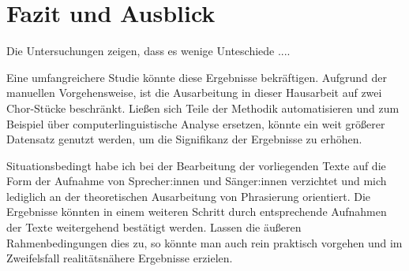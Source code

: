 \chapter{Fazit und Ausblick}
\label{chap:Fazit und Ausblick}



Die Untersuchungen zeigen, dass es wenige Unteschiede ....

Eine umfangreichere Studie könnte diese Ergebnisse bekräftigen. Aufgrund der manuellen Vorgehensweise, ist die Ausarbeitung in dieser Hausarbeit auf zwei Chor-Stücke beschränkt. Ließen sich Teile der Methodik automatisieren und zum Beispiel über computerlinguistische Analyse ersetzen, könnte ein weit größerer Datensatz genutzt werden, um die Signifikanz der Ergebnisse zu erhöhen.

Situationsbedingt habe ich bei der Bearbeitung der vorliegenden Texte auf die Form der Aufnahme von Sprecher:innen und Sänger:innen verzichtet und mich lediglich an der theoretischen Ausarbeitung von Phrasierung orientiert. Die Ergebnisse könnten in einem weiteren Schritt durch entsprechende Aufnahmen der Texte weitergehend bestätigt werden. Lassen die äußeren Rahmenbedingungen dies zu, so könnte man auch rein praktisch vorgehen und im Zweifelsfall realitätsnähere Ergebnisse erzielen.
